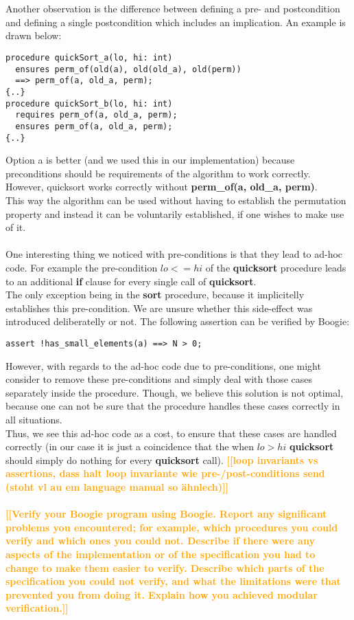 \documentclass{report}
\newcommand{\todo}[1]{\textsf{\textbf{\textcolor{orange}{[[#1]]}}}}
\begin{document}
\\\\
Another observation is the difference between defining a pre- and postcondition and defining a single postcondition which includes an implication.
An example is drawn below:
\begin{lstlisting}
procedure quickSort_a(lo, hi: int)
  ensures perm_of(old(a), old(old_a), old(perm)) 
  ==> perm_of(a, old_a, perm);
{..}
procedure quickSort_b(lo, hi: int)
  requires perm_of(a, old_a, perm);
  ensures perm_of(a, old_a, perm);
{..}
\end{lstlisting}
Option a is better (and we used this in our implementation) because preconditions should be requirements of the algorithm to work correctly.
However, quicksort works correctly without \textbf{perm\_of(a, old\_a, perm)}.
\\
This way the algorithm can be used without having to establish the permutation property
and instead it can be voluntarily established, if one wishes to make use of it.
\\\\
One interesting thing we noticed with pre-conditions is that they lead to ad-hoc code.
For example the pre-condition $lo <= hi$ of the \textbf{quicksort} procedure leads to
an additional \textbf{if} clause for every single call of \textbf{quicksort}.\\
The only exception being in the \textbf{sort} procedure, because it implicitelly
establishes this pre-condition. We are unsure whether this side-effect was
introduced deliberatelly or not. The following assertion can be verified by Boogie:
\begin{lstlisting}
assert !has_small_elements(a) ==> N > 0;
\end{lstlisting}
However, with regards to the ad-hoc code due to pre-conditions, one might consider
to remove these pre-conditions and simply deal with those cases separately inside
the procedure. Though, we believe this solution is not optimal, because one can not
be sure that the procedure handles these cases correctly in all situations.\\
Thus, we see this ad-hoc code as a cost, to ensure that these cases are handled
correctly (in our case it is just a coincidence that the when $lo > hi$ \textbf{quicksort}
should simply do nothing for every \textbf{quicksort} call).
\todo{loop invariants vs assertions, dass halt loop invariante wie pre-/post-conditions send (stoht vl au em language manual so ähnlech)}
\\\\
\todo{Verify your Boogie program using Boogie. Report any
significant problems you encountered; for example, which procedures you could verify
and which ones you could not. Describe if there were any aspects of the implementation
or of the specification you had to change to make them easier to verify. Describe which parts of the specification you could not verify, and what the limitations were that
prevented you from doing it. Explain how you achieved modular verification.}
\end{document}
